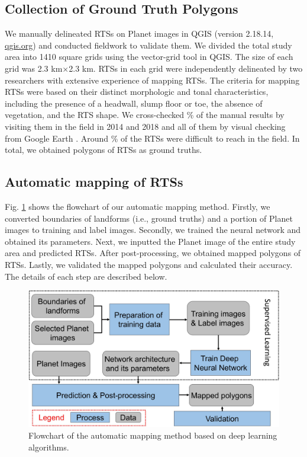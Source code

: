 \documentclass[authoryear,preprint,review,12pt]{elsarticle}
\begin{document}
\subsection{Collection of Ground Truth Polygons}
\label{subsec_collect_groundtruth}

We manually delineated RTSs  on Planet images in QGIS (version 2.18.14, \url{qgis.org}) and conducted fieldwork to validate them. We divided the total study area into 1410 square grids using the vector-grid tool in QGIS. The size of each grid was 2.3 km$\times$2.3 km. RTSs in each grid were independently delineated by two researchers with extensive experience of mapping RTSs. 
The criteria for mapping RTSs were based on their distinct morphologic and tonal characteristics, including the presence of a headwall, slump floor or toe, the absence of vegetation, and the RTS shape. We cross-checked \% of the manual results by visiting them in the field in 2014 and 2018 and all of them by visual checking  from Google Earth . Around \% of the RTSs were difficult to reach in the field. In total, we obtained  polygons of RTSs as ground truths.  

\subsection{Automatic mapping of RTSs}
\label{subsec_auto_mapping}

Fig. \ref{fig_flowchart} shows the flowchart of our automatic mapping method. Firstly, we converted boundaries of landforms (i.e., ground truths) and a portion of Planet images to training and label images. Secondly, we trained the neural network and obtained its parameters. Next, we inputted the Planet image of the entire study area and predicted RTSs. After post-processing, we obtained mapped polygons of RTSs. Lastly, we validated the mapped polygons and calculated their accuracy. The details of each step are described below.

\begin{figure}[ht]
	\centering
	\includegraphics[width=12cm]{figures/flowchart_trim.jpg}
	\caption{Flowchart of the automatic mapping method based on deep learning algorithms.}
	\label{fig_flowchart}
\end{figure}
\end{document}
